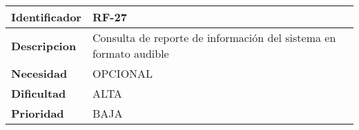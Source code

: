 \begin{center}
    \begin{tabular}{|p{2.6cm}|p{12cm}|}
    \hline
    \textbf{Identificador} & RF-27\\
    \hline
    \textbf{Descripcion} & Consulta de reporte de información del sistema en formato audible\\
    \hline
    \textbf{Necesidad} & OPCIONAL\\
    \hline
    \textbf{Dificultad} & ALTA\\
    \hline
    \textbf{Prioridad} & BAJA\\
    \hline
    \end{tabular}
\end{center}
